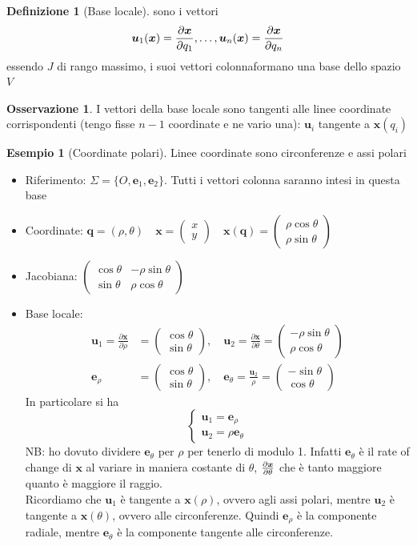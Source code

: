 \documentclass[a4paper,10pt]{article}
\theoremstyle{definition}
\newcommand{\bv}{\boldsymbol} %
\newcommand{\cv}[2]{\begin{pmatrix} #1 \\ #2 \end{pmatrix}} %
\theoremstyle{indentdefinition}
\newtheorem{defn}{Definizione}[section]
\theoremstyle{indenttheorem}
\theoremstyle{myremark}
\newtheorem*{rem*}{Osservazione}
\newtheorem{example*}{Esempio}
\theoremstyle{indentgeneral}
\begin{document}
\begin{defn}[Base locale]
    sono i vettori $$\bv{u}_1(\bv{x})=\pdv{\bv{x}}{q_1},\dots,\bv{u}_n(\bv{x})=\pdv{\bv{x}}{q_n}$$
    essendo $J$ di rango massimo, i suoi vettori colonnaformano una base dello spazio $V$ 
\end{defn}

\begin{rem*}
    I vettori della base locale sono tangenti alle linee coordinate corrispondenti (tengo fisse $n-1$ coordinate e ne vario una): $\bv{u}_i$ tangente a $\bv{x}(q_i)$
\end{rem*}

\begin{example*}[Coordinate polari]
    Linee coordinate sono circonferenze e assi polari
    \begin{itemize}
        \item Riferimento: $\Sigma=\{O,\boldsymbol{e}_{1},\boldsymbol{e}_{2}\}$. Tutti i vettori colonna saranno intesi in questa base
        \item Coordinate:  $\bv{q}=(\rho,\theta) \quad \bv{x}=\cv{x}{y} \quad  \bv{x}(\bv{q})=\cv{\rho\cos\theta}{\rho\sin\theta}$
        \item Jacobiana: $\begin{pmatrix}
            \cos\theta & -\rho\sin\theta \\ \sin\theta & \rho\cos\theta
        \end{pmatrix}$
        \item Base locale: 
        \begin{align*}
            \bv{u}_1=\frac{\partial\bv{x}}{\partial \rho} & =\cv{\cos\theta}{\sin\theta}, \quad \bv{u}_2 =\frac{\partial\bv{x}}{\partial \theta}= \cv{-\rho\sin\theta}{\rho\cos\theta} \\
            \bv{e}_\rho & =\cv{\cos\theta}{\sin\theta}, \quad \bv{e}_\theta  = \frac{\bv{u}_2}{\rho}=\cv{-\sin\theta}{\cos\theta} 
        \end{align*}
        In particolare si ha $$\begin{cases}
            \bv{u}_1=\bv{e}_\rho \\
            \bv{u}_2=\rho\bv{e}_\theta
        \end{cases}$$
     NB: ho dovuto  dividere $\bv{e}_\theta$ per $\rho$ per tenerlo di modulo 1. Infatti $\bv{e}_\theta$ è il rate of change di $\bv{x}$ al variare in maniera costante di $\theta$, $\pdv{\bv{x}}{\theta}$ che è tanto maggiore quanto è maggiore il raggio. \\
Ricordiamo che $\bv{u}_1$ è tangente a $\bv{x}(\rho)$, ovvero agli assi polari, mentre $\bv{u}_2$ è tangente a $\bv{x}(\theta)$, ovvero alle circonferenze. Quindi $\bv{e}_\rho$ è la componente radiale, mentre $\bv{e}_\theta$ è la componente tangente alle circonferenze.
    \end{itemize}
\end{example*}
\end{document}
